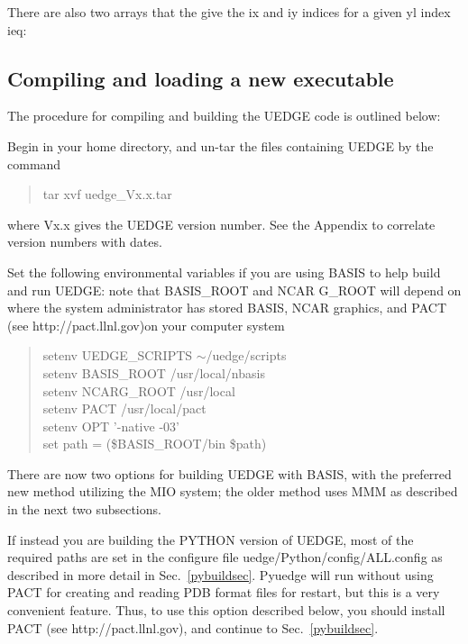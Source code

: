 \documentclass [12pt]{article}
\def\hsa{\hskip.4truein}
\def\hsp6{\hskip.6truein}
\def\tild{$\sim$}
\begin{document}
There are also two arrays that the give the ix and iy indices for a given
{\sf yl} index ieq:

{\sf
{}
}

\subsection{Compiling and loading a new executable} \label{compilesec}

The procedure for compiling and building the {\sf UEDGE} code is outlined
below: 

\noindent
Begin in your home directory, and un-tar the files containing {\sf UEDGE} by 
the command
\begin{verse} \sf
    tar xvf uedge\_Vx.x.tar 
\end{verse}
where Vx.x gives the {\sf UEDGE} version number.  See the Appendix
to correlate version numbers with dates.

Set the following environmental variables if you are using {\sf BASIS} to help
build and run {\sf UEDGE}: note that {\sf BASIS\_ROOT} and {\sf NCAR G\_ROOT}
will depend on where the system administrator has stored {\sf BASIS}, {\sf
NCAR} graphics, and {\sf PACT} (see {\sf http://pact.llnl.gov})on your
computer system
\begin{verse} \sf
 setenv UEDGE\_SCRIPTS \tild/uedge/scripts \\
 setenv BASIS\_ROOT /usr/local/nbasis \\
 setenv NCARG\_ROOT /usr/local \\
 setenv PACT /usr/local/pact \\
 setenv OPT '-native -03' \\
 set path = (\$BASIS\_ROOT/bin \$path)
\end{verse}
There are now two options for building {\sf UEDGE} with {\sf BASIS}, with the
preferred new method utilizing the {\sf MIO} system; the older method uses
{\sf MMM} as described in the next two subsections. 

If instead you are building the {\sf PYTHON} version of {\sf UEDGE}, most of
the required paths are set in the configure file
uedge/Python/config/ALL.config as described in more detail in
Sec.~\ref{pybuildsec}.  Pyuedge will run without using {\sf PACT} for creating
and reading {\sf PDB} format files for restart, but this is a very convenient
feature.  Thus, to use this option described below, you should install {\sf
PACT} (see {\sf http://pact.llnl.gov}), and continue to Sec.~\ref{pybuildsec}.
\end{document}
